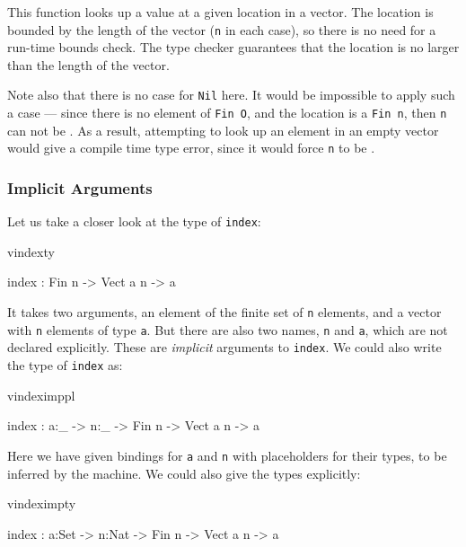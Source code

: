 \noindent
This function looks up a value at a given location in a vector. The location is
bounded by the length of the vector (\texttt{n} in each case), so there is no
need for a run-time bounds check. The type checker guarantees that the location
is no larger than the length of the vector.

Note also that there is no case for \texttt{Nil} here. It would be impossible
to apply such a case ---
since there is no element of \texttt{Fin O}, and the location is a
\texttt{Fin n}, then \texttt{n} can not be .  As a result, attempting to
look up an element in an empty vector would give a compile time type error,
since it would force \texttt{n} to be .

\subsubsection{Implicit Arguments}

Let us take a closer look at the type of \texttt{index}:

\begin{SaveVerbatim}{vindexty}

index : Fin n -> Vect a n -> a

\end{SaveVerbatim}

\noindent
It takes two arguments, an element of the finite set of \texttt{n} elements, and a vector
with \texttt{n} elements of type \texttt{a}. But there are also two names, 
\texttt{n} and \texttt{a}, which are not declared explicitly. These are \emph{implicit}
arguments to \texttt{index}. We could also write the type of \texttt{index} as:

\begin{SaveVerbatim}{vindeximppl}

index : {a:_} -> {n:_} -> Fin n -> Vect a n -> a

\end{SaveVerbatim}

\noindent
Here we have given bindings for \texttt{a} and \texttt{n} with placeholders for
their types, to be inferred by the machine. We could also give the types explicitly:

\begin{SaveVerbatim}{vindeximpty}

index : {a:Set} -> {n:Nat} -> Fin n -> Vect a n -> a

\end{SaveVerbatim}

